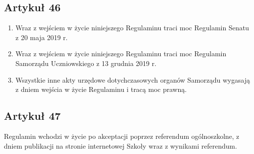 \documentclass[14pt]{article}
\newenvironment{ustepy}{%
	\begin{enumerate}[leftmargin=1.5em, itemindent=1pt, labelwidth=1em, itemsep=5pt]
	}{%
	\end{enumerate}
}
\begin{document}
\subsection*{Artykuł 46}
\begin{ustepy}
	\item Wraz z wejściem w życie niniejszego Regulaminu traci moc Regulamin Senatu z 20 maja 2019 r.
	\item Wraz z wejściem w życie niniejszego Regulaminu traci moc Regulamin Samorządu Uczniowskiego z 13 grudnia 2019 r.
	\item Wszystkie inne akty urzędowe dotychczasowych organów Samorządu wygasają z dniem wejścia w życie Regulaminu i tracą moc prawną.
\end{ustepy}
\subsection*{Artykuł 47}
Regulamin wchodzi w życie po akceptacji poprzez referendum ogólnoszkolne, z dniem publikacji na stronie internetowej Szkoły wraz z wynikami referendum.

	
\end{document}
